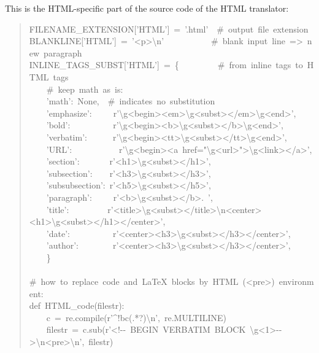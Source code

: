 \documentclass[a4paper,english]{article}
\begin{document}
This is the HTML-specific part of the
source code of the HTML translator:
%
\begin{quote}{\ttfamily \raggedright \noindent
FILENAME\_EXTENSION{[}'HTML'{]}~=~'.html'~~\#~output~file~extension\\
BLANKLINE{[}'HTML'{]}~=~'<p>\textbackslash{}n'~~~~~~~~~~~\#~blank~input~line~=>~new~paragraph\\
INLINE\_TAGS\_SUBST{[}'HTML'{]}~=~\{~~~~~~~~~\#~from~inline~tags~to~HTML~tags\\
~~~~\#~keep~math~as~is:\\
~~~~'math':~None,~~\#~indicates~no~substitution\\
~~~~'emphasize':~~~~~r'\textbackslash{}g<begin><em>\textbackslash{}g<subst></em>\textbackslash{}g<end>',\\
~~~~'bold':~~~~~~~~~~r'\textbackslash{}g<begin><b>\textbackslash{}g<subst></b>\textbackslash{}g<end>',\\
~~~~'verbatim':~~~~~~r'\textbackslash{}g<begin><tt>\textbackslash{}g<subst></tt>\textbackslash{}g<end>',\\
~~~~'URL':~~~~~~~~~~~r'\textbackslash{}g<begin><a~href="\textbackslash{}g<url>">\textbackslash{}g<link></a>',\\
~~~~'section':~~~~~~~r'<h1>\textbackslash{}g<subst></h1>',\\
~~~~'subsection':~~~~r'<h3>\textbackslash{}g<subst></h3>',\\
~~~~'subsubsection':~r'<h5>\textbackslash{}g<subst></h5>',\\
~~~~'paragraph':~~~~~r'<b>\textbackslash{}g<subst></b>.~',\\
~~~~'title':~~~~~~~~~r'<title>\textbackslash{}g<subst></title>\textbackslash{}n<center><h1>\textbackslash{}g<subst></h1></center>',\\
~~~~'date':~~~~~~~~~~r'<center><h3>\textbackslash{}g<subst></h3></center>',\\
~~~~'author':~~~~~~~~r'<center><h3>\textbackslash{}g<subst></h3></center>',\\
~~~~\}\\
~\\
\#~how~to~replace~code~and~LaTeX~blocks~by~HTML~(<pre>)~environment:\\
def~HTML\_code(filestr):\\
~~~~c~=~re.compile(r'\textasciicircum{}!bc(.*?)\textbackslash{}n',~re.MULTILINE)\\
~~~~filestr~=~c.sub(r'<!-{}-~BEGIN~VERBATIM~BLOCK~\textbackslash{}g<1>-{}->\textbackslash{}n<pre>\textbackslash{}n',~filestr)\\
}
\end{quote}
\end{document}
